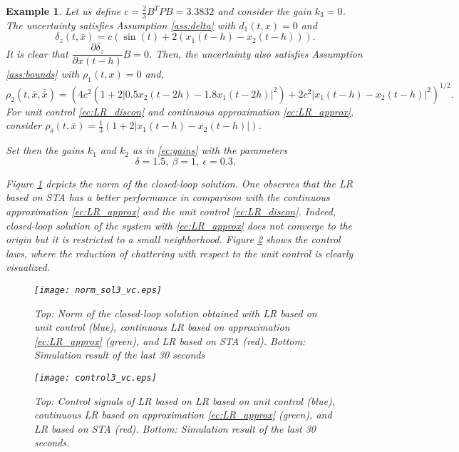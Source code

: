 \documentclass[onecolumn]{IEEEtran}
\newtheorem{example}{Example}
\begin{document}
\begin{example}
	Let us define $c=\frac{2}{3}B^TPB=3.3832$ and consider the gain $k_3=0$.  The  uncertainty satisfies Assumption \ref{ass:delta} with $d_1(t,x)=0$ and 
	\begin{equation*}
	\delta_z(t,\bar x)=c\left(\sin(t)+2(x_1(t-h)-x_2(t-h))\right).
	\end{equation*}
	It is clear that $\dfrac{\partial \delta_z}{\partial x(t-h)}B=0$. Then, the uncertainty also satisfies Assumption \ref{ass:bounds} with
	$\rho_1(t,x)=0$ and, 
	\begin{equation*}
	\rho_2(t,\bar x,\bar {\bar x})=(4c^2\left(1+2|0.5x_2(t-2h)-1.8x_1(t-2h)|^2\right)+2c^2|x_1(t-h)-x_2(t-h)|^2)^{1/2}.
	\end{equation*}
	For unit control \eqref{ec:LR_discon} and continuous approximation \eqref{ec:LR_approx},  consider $\rho_{\delta}(t,\bar x)=\frac{1}{3}(1+2|x_1(t-h)-x_2(t-h)|)$.
	
	Set then the gains $k_1$ and $k_2$ as in \eqref{ec:gains} with the parameters
	\begin{equation*}
	\delta= 1.5,\:\beta= 1,\:\epsilon=0.3.
	\end{equation*}
	
	Figure \ref{fig:sol} depicts the norm of the closed-loop solution. One observes  that the  LR based on STA has a better performance in comparison with the continuous approximation  \eqref{ec:LR_approx} and the unit control \eqref{ec:LR_discon}. Indeed, closed-loop solution of the system with \eqref{ec:LR_approx} does not converge to the origin but it is restricted to a small neighborhood. Figure \ref{fig:control} shows the control laws, where the reduction of chattering with respect to the unit control is clearly visualized. 
	
	
	
	\begin{figure}[htpb!]
		\centering
		\texttt{[image: norm\_sol3\_vc.eps]}
		\caption{Top: Norm of the closed-loop solution obtained with  LR based on unit control (blue), continuous LR based on approximation \eqref{ec:LR_approx} (green), and  LR based on STA (red). Bottom: Simulation result of the last 30 seconds}
		\label{fig:sol}
	\end{figure}
	
	\begin{figure}[htpb!]
		\centering
		\texttt{[image: control3\_vc.eps]}
		\caption{Top: Control signals of LR based on LR based on unit control (blue), continuous LR based on approximation \eqref{ec:LR_approx} (green), and  LR based on STA (red). Bottom: Simulation result of the last 30 seconds.}
		\label{fig:control}
	\end{figure}
	
\end{example}
\end{document}
